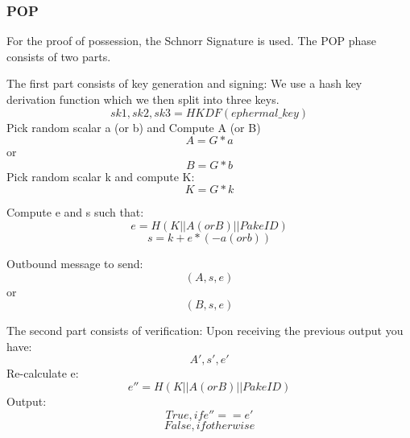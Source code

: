 \subsubsection{POP}
For the proof of possession, the Schnorr Signature is used. 
The POP phase consists of two parts. 

The first part consists of key generation and signing:
We use a hash key derivation function which we then split into three
keys. 
\[sk1, sk2, sk3 = HKDF(ephermal\_key)\]
Pick random scalar a (or b) and Compute A (or B)
\[A = G*a\]
or
\[B = G*b\]
Pick random scalar k and compute K:
\[K = G*k\]

Compute e and s such that:
\[e = H(K || A (or B) || PakeID)\]
\[s = k + e * (-a (or b))\]

Outbound message to send:
\[(A, s, e)\]
or
\[(B, s, e)\]

The second part consists of verification:
Upon receiving the previous output you have:
\[A', s', e'\]
Re-calculate e:
\[e'' = H(K || A (or B) || PakeID)\]
Output:
\[True, if e''== e'\]
\[False, if otherwise\]

